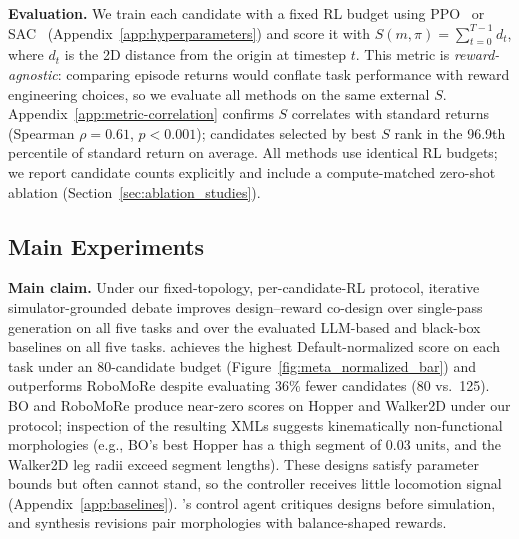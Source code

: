 \textbf{Evaluation.} We train each candidate with a fixed RL budget using PPO~\cite{schulman2017proximal} or SAC~\cite{haarnoja2018soft} (Appendix~\ref{app:hyperparameters}) and score it with $S(m,\pi)=\sum_{t=0}^{T-1} d_t$, where $d_t$ is the 2D distance from the origin at timestep $t$. This metric is \emph{reward-agnostic}: comparing episode returns would conflate task performance with reward engineering choices, so we evaluate all methods on the same external $S$. Appendix~\ref{app:metric-correlation} confirms $S$ correlates with standard returns (Spearman $\rho = 0.61$, $p < 0.001$); candidates selected by best $S$ rank in the 96.9th percentile of standard return on average. All methods use identical RL budgets; we report candidate counts explicitly and include a compute-matched zero-shot ablation (Section~\ref{sec:ablation_studies}).

\subsection{Main Experiments}
\label{sec:main_experiments}

\textbf{Main claim.} Under our fixed-topology, per-candidate-RL protocol, iterative simulator-grounded debate improves design--reward co-design over single-pass generation on all five tasks and over the evaluated LLM-based and black-box baselines on all five tasks. \abbrev{} achieves the highest Default-normalized score on each task under an 80-candidate budget (Figure~\ref{fig:meta_normalized_bar}) and outperforms RoboMoRe despite evaluating 36\% fewer candidates (80 vs.\ 125). BO and RoboMoRe produce near-zero scores on Hopper and Walker2D under our protocol; inspection of the resulting XMLs suggests kinematically non-functional morphologies (e.g., BO's best Hopper has a thigh segment of $0.03$ units, and the Walker2D leg radii exceed segment lengths). These designs satisfy parameter bounds but often cannot stand, so the controller receives little locomotion signal (Appendix~\ref{app:baselines}). \abbrev{}'s control agent critiques designs before simulation, and synthesis revisions pair morphologies with balance-shaped rewards.

